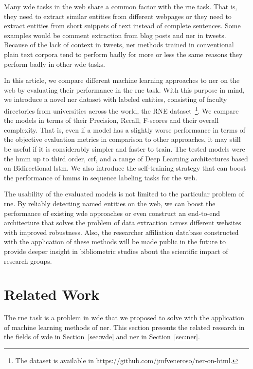 \documentclass{nle}
\begin{document}
Many \gls{wde} tasks in the web share a common
factor with the \gls{rne} task. That is, they need to extract similar
entities from different webpages or they need to extract entities from short snippets of text 
instead of complete sentences. Some examples would be comment extraction from blog
posts and \gls{ner} in tweets. Because of the lack of context in tweets, \gls{ner} methods trained 
in conventional plain text corpora tend to perform badly for more or less the same reasons 
they perform badly in other \gls{wde} tasks.

In this article, we compare different machine learning approaches to 
\gls{ner} on the web by evaluating their performance in the 
\gls{rne} task. With this purpose in mind, we introduce a novel \gls{ner} dataset 
with labeled entities, consisting of faculty directories from universities across the world,
the RNE dataset~\footnote{
The dataset is available in https://github.com/jmfveneroso/ner-on-html.
}.
We compare the models in terms of their Precision, Recall, F-scores and their 
overall complexity. That is, even if a model has a slightly worse performance in terms of the
objective evaluation metrics in comparison to other approaches, it may still be useful if it 
is considerably simpler and faster to train.
The tested models were the \gls{hmm} up to third order, \gls{crf}, and a range of Deep Learning 
architectures based on Bidirectional \gls{lstm}. We also 
introduce the self-training strategy that can boost the performance 
of \gls{hmm}s in sequence labeling tasks for the web. 

The usability of the evaluated models is not limited to the particular problem of \gls{rne}. 
By reliably detecting named entities on the web, we can boost the performance 
of existing \gls{wde} approaches or even construct an end-to-end architecture that
solves the problem of data extraction across different websites with improved robustness. Also, 
the researcher affiliation database constructed with the application of these methods will
be made public in the future to provide deeper insight in bibliometric studies about the
scientific impact of research groups.


\section{Related Work}
\label{cha:related_work}

The \gls{rne} task is a problem in \gls{wde} that
we proposed to solve with the application of machine learning methods of \gls{ner}.
This section presents the related research in the fields of \gls{wde} 
in Section~\ref{sec:wde} and \gls{ner} in Section~\ref{sec:ner}.
\end{document}
